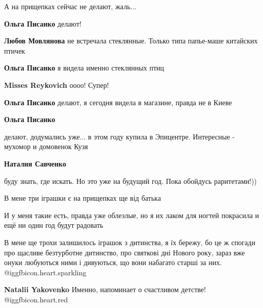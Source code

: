  
 
 
 
 
А на прищепках сейчас не делают, жаль...

\textbf{Ольга Писанко} делают!

\textbf{Любов Мовлянова} не встречала стеклянные. Только типа папье-маше китайских птичек

\textbf{Ольга Писанко} я видела именно стеклянных птиц

\textbf{Misses Reykovich} оооо! Супер!

\textbf{Ольга Писанко} делают, я сегодня видела в магазине, правда не в Киеве

\textbf{Ольга Писанко} 

делают, додумались уже... в этом году купила в Эпицентре. Интересные - мухомор
и домовенок Кузя

\textbf{Наталия Савченко} 

буду знать, где искать. Но это уже на будущий год. Пока обойдусь раритетами!))

В мене три іграшки є на прищепках ще від батька

И у меня такие есть, правда уже облезлые, но я их лаком для ногтей покрасила и
ещё ни один год будут радовать


В мене ще трохи залишилось іграшок з дитинства, я їх бережу, бо це ж спогади
про щасливе безтурботне дитинство, про святкові дні Нового року, зараз вже
онуки любуються ними і дивуються, що вони набагато старші за них. @igg{fbicon.heart.sparkling} 

\textbf{Natalii Yakovenko}
Именно, напоминает о счастливом детстве! @igg{fbicon.heart.red}
